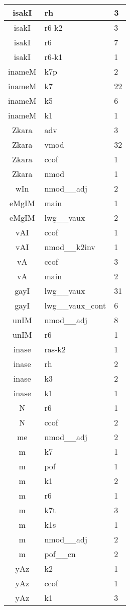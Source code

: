 \documentclass[a4 paper]{article}
\begin{document}
\begin{longtable}{cp{}p{}}
isakI & rh & 3\\ \midrule isakI & r6-k2 & 3\\ \midrule isakI & r6 & 7\\ \midrule isakI & r6-k1 & 1\\ \midrule 
inameM & k7p & 2\\ \midrule inameM & k7 & 22\\ \midrule inameM & k5 & 6\\ \midrule inameM & k1 & 1\\ \midrule 
Zkara & adv & 3\\ \midrule Zkara & vmod & 32\\ \midrule Zkara & ccof & 1\\ \midrule Zkara & nmod & 1\\ \midrule 
wIn & nmod\_\_adj & 2\\ \midrule 
eMgIM & main & 1\\ \midrule eMgIM & lwg\_\_vaux & 2\\ \midrule 
vAI & ccof & 1\\ \midrule vAI & nmod\_\_k2inv & 1\\ \midrule 
vA & ccof & 3\\ \midrule vA & main & 2\\ \midrule 
gayI & lwg\_\_vaux & 31\\ \midrule gayI & lwg\_\_vaux\_cont & 6\\ \midrule 
unIM & nmod\_\_adj & 8\\ \midrule unIM & r6 & 1\\ \midrule 
inase & ras-k2 & 1\\ \midrule inase & rh & 2\\ \midrule inase & k3 & 2\\ \midrule inase & k1 & 1\\ \midrule 
N & r6 & 1\\ \midrule N & ccof & 2\\ \midrule 
me & nmod\_\_adj & 2\\ \midrule 
m & k7 & 1\\ \midrule m & pof & 1\\ \midrule m & k1 & 2\\ \midrule m & r6 & 1\\ \midrule m & k7t & 3\\ \midrule m & k1s & 1\\ \midrule m & nmod\_\_adj & 2\\ \midrule m & pof\_\_cn & 2\\ \midrule 
yAz & k2 & 1\\ \midrule yAz & ccof & 1\\ \midrule yAz & k1 & 3\\ \midrule 

\end{longtable}
\end{document}
